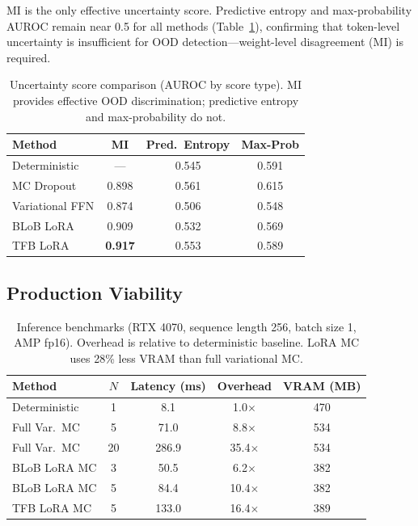 \documentclass{article}
\newcommand{\ra}[1]{\renewcommand{\arraystretch}{#1}}
\begin{document}
MI is the only effective uncertainty score. Predictive entropy and max-probability AUROC remain near 0.5 for all methods (Table~\ref{tab:score-comparison}), confirming that token-level uncertainty is insufficient for OOD detection---weight-level disagreement (MI) is required.

\begin{table}[t]
\caption{Uncertainty score comparison (AUROC by score type). MI provides effective OOD discrimination; predictive entropy and max-probability do not.}
\label{tab:score-comparison}
\centering
\small
\ra{1.15}
\begin{tabular}{@{}lccc@{}}
\toprule
Method & MI & Pred.\ Entropy & Max-Prob \\
\midrule
Deterministic & --- & 0.545 & 0.591 \\
MC Dropout & 0.898 & 0.561 & 0.615 \\
Variational FFN & 0.874 & 0.506 & 0.548 \\
BLoB LoRA & 0.909 & 0.532 & 0.569 \\
TFB LoRA & \textbf{0.917} & 0.553 & 0.589 \\
\bottomrule
\end{tabular}
\end{table}

\subsection{Production Viability}

\begin{table}[t]
\caption{Inference benchmarks (RTX 4070, sequence length 256, batch size 1, AMP fp16). Overhead is relative to deterministic baseline. LoRA MC uses 28\% less VRAM than full variational MC.}
\label{tab:inference}
\centering
\small
\ra{1.15}
\begin{tabular}{@{}lcccc@{}}
\toprule
Method & $N$ & Latency (ms) & Overhead & VRAM (MB) \\
\midrule
Deterministic & 1 & 8.1 & 1.0$\times$ & 470 \\
Full Var.\ MC & 5 & 71.0 & 8.8$\times$ & 534 \\
Full Var.\ MC & 20 & 286.9 & 35.4$\times$ & 534 \\
BLoB LoRA MC & 3 & 50.5 & 6.2$\times$ & 382 \\
BLoB LoRA MC & 5 & 84.4 & 10.4$\times$ & 382 \\
TFB LoRA MC & 5 & 133.0 & 16.4$\times$ & 389 \\
\bottomrule
\end{tabular}
\end{table}
\end{document}
